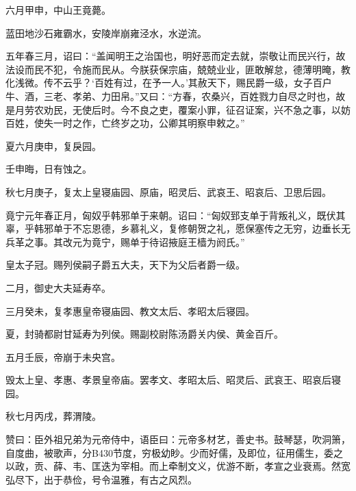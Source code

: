 \documentclass[12pt,UTF8]{ctexbook}
\begin{document}
六月甲申，中山王竟薨。



蓝田地沙石雍霸水，安陵岸崩雍泾水，水逆流。



五年春三月，诏曰：“盖闻明王之治国也，明好恶而定去就，崇敬让而民兴行，故法设而民不犯，令施而民从。今朕获保宗庙，兢兢业业，匪敢解怠，德薄明晻，教化浅微。传不云乎？‘百姓有过，在予一人。’其赦天下，赐民爵一级，女子百户牛、酒，三老、孝弟、力田帛。”又曰：“方春，农桑兴，百姓戮力自尽之时也，故是月劳农劝民，无使后时。今不良之吏，覆案小罪，征召证案，兴不急之事，以妨百姓，使失一时之作，亡终岁之功，公卿其明察申敕之。”



夏六月庚申，复戾园。



壬申晦，日有蚀之。



秋七月庚子，复太上皇寝庙园、原庙，昭灵后、武哀王、昭哀后、卫思后园。



竟宁元年春正月，匈奴乎韩邪单于来朝。诏曰：“匈奴郅支单于背叛礼义，既伏其辜，乎韩邪单于不忘恩德，乡慕礼义，复修朝贺之礼，愿保塞传之无穷，边垂长无兵革之事。其改元为竟宁，赐单于待诏掖庭王樯为阏氏。”



皇太子冠。赐列侯嗣子爵五大夫，天下为父后者爵一级。



二月，御史大夫延寿卒。



三月癸未，复孝惠皇帝寝庙园、教文太后、孝昭太后寝园。



夏，封骑都尉甘延寿为列侯。赐副校尉陈汤爵关内侯、黄金百斤。



五月壬辰，帝崩于未央宫。



毁太上皇、孝惠、孝景皇帝庙。罢孝文、孝昭太后、昭灵后、武哀王、昭哀后寝园。



秋七月丙戌，葬渭陵。



赞曰：臣外祖兄弟为元帝侍中，语臣曰：元帝多材艺，善史书。鼓琴瑟，吹洞箫，自度曲，被歌声，分B430节度，穷极幼眇。少而好儒，及即位，征用儒生，委之以政，贡、薛、韦、匡迭为宰相。而上牵制文义，优游不断，孝宣之业衰焉。然宽弘尽下，出于恭俭，号令温雅，有古之风烈。
\end{document}
